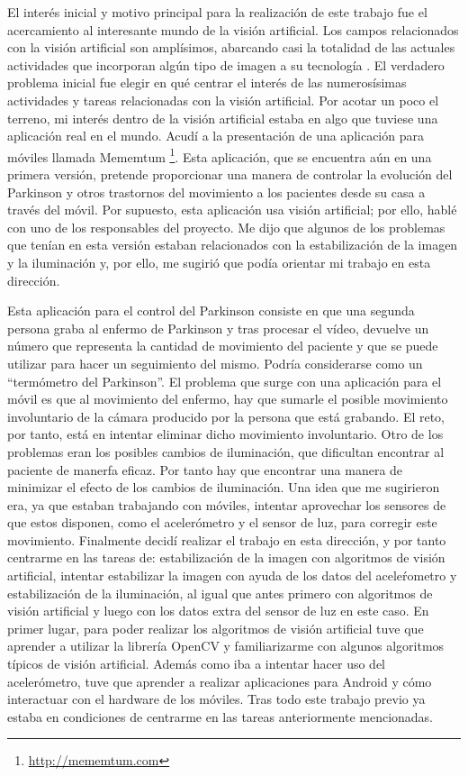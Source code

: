 \documentclass[a4paper,openright, 12pt]{book}
\begin{document}
El interés inicial y motivo principal para la realización de este trabajo fue el acercamiento al interesante mundo de la visión artificial. Los campos relacionados con la visión artificial son amplísimos, abarcando casi la totalidad de las actuales actividades que incorporan algún tipo de imagen a su tecnología . El verdadero problema inicial fue elegir en qué centrar el interés de las numerosísimas actividades y tareas relacionadas con la visión artificial. Por acotar un poco el terreno, mi interés dentro de la visión artificial estaba en algo que tuviese una aplicación real en el mundo. Acudí a la presentación de una aplicación para móviles llamada Mememtum \footnote{\url{http://mememtum.com}}. Esta aplicación, que se encuentra aún en una primera versión, pretende proporcionar una manera de controlar la evolución del Parkinson y otros trastornos del movimiento a los pacientes desde su casa a través del móvil. Por supuesto, esta aplicación usa visión artificial; por ello, hablé con uno de los responsables del proyecto. Me dijo que algunos de los problemas que tenían en esta versión estaban relacionados con la estabilización de la imagen y la iluminación y, por ello, me sugirió que podía orientar mi trabajo en esta dirección.


Esta aplicación para el control del Parkinson consiste en que una segunda persona graba al enfermo de Parkinson y tras procesar el vídeo, devuelve un número que representa la cantidad de movimiento del paciente y que se puede utilizar para hacer un seguimiento del mismo. Podría considerarse como un ``termómetro del Parkinson''. El problema que surge con una aplicación para el móvil es que al movimiento del enfermo, hay que sumarle el posible movimiento involuntario de la cámara producido por la persona que está grabando. El reto, por tanto, está en intentar eliminar dicho movimiento involuntario. Otro de los problemas eran los posibles cambios de iluminación, que dificultan encontrar al paciente de manerfa eficaz. Por tanto hay que encontrar una manera de minimizar el efecto de los cambios de iluminación.
Una idea que me sugirieron era, ya que estaban trabajando con móviles, intentar aprovechar los sensores de que estos disponen, como el acelerómetro y el sensor de luz, para corregir este  movimiento.
\newpage
Finalmente decidí realizar el trabajo en esta dirección, y por tanto centrarme en las tareas de: estabilización de la imagen con algoritmos de visión artificial, intentar estabilizar la imagen con ayuda de los datos del aceleŕometro y estabilización de la iluminación, al igual que antes primero con algoritmos de visión artificial y luego con los datos extra del sensor de luz en este caso.
En primer lugar, para poder realizar los algoritmos de visión artificial tuve que aprender a utilizar la librería OpenCV\cite{opencvrefman} y familiarizarme con algunos algoritmos típicos de visión artificial. Además como iba a intentar hacer uso del acelerómetro, tuve que aprender a realizar aplicaciones para Android y cómo interactuar con el hardware de los móviles. Tras todo este trabajo previo ya estaba en condiciones de centrarme en las tareas anteriormente mencionadas.
\end{document}
